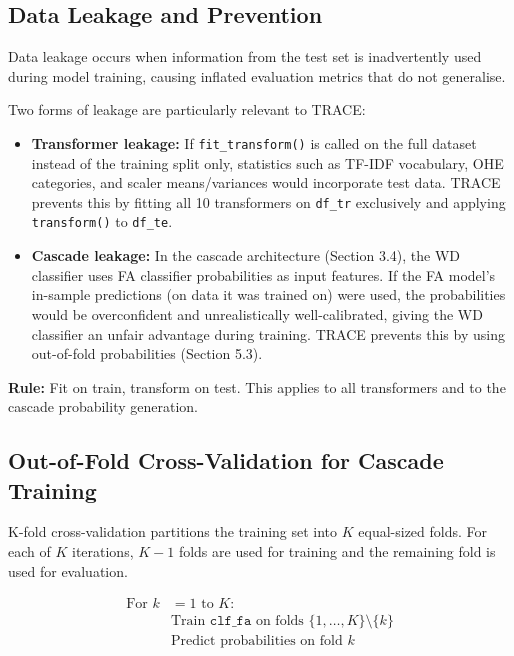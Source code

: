 \documentclass[10pt]{article}
\begin{document}
\subsection{Data Leakage and Prevention}

Data leakage occurs when information from the test set is inadvertently used during model training, causing inflated evaluation metrics that do not generalise.

Two forms of leakage are particularly relevant to TRACE:
\begin{itemize}
    \item \textbf{Transformer leakage:} If \texttt{fit\_transform()} is called on the full dataset instead of the training split only, statistics such as TF-IDF vocabulary, OHE categories, and scaler means/variances would incorporate test data. TRACE prevents this by fitting all 10 transformers on \texttt{df\_tr} exclusively and applying \texttt{transform()} to \texttt{df\_te}.
    \item \textbf{Cascade leakage:} In the cascade architecture (Section 3.4), the WD classifier uses FA classifier probabilities as input features. If the FA model's in-sample predictions (on data it was trained on) were used, the probabilities would be overconfident and unrealistically well-calibrated, giving the WD classifier an unfair advantage during training. TRACE prevents this by using out-of-fold probabilities (Section 5.3).
\end{itemize}

\textbf{Rule:} Fit on train, transform on test. This applies to all transformers and to the cascade probability generation.

\subsection{Out-of-Fold Cross-Validation for Cascade Training}

K-fold cross-validation partitions the training set into \(K\) equal-sized folds. For each of \(K\) iterations, \(K-1\) folds are used for training and the remaining fold is used for evaluation.

\begin{align}
\text{For } k &= 1 \text{ to } K: \\
&\text{Train } \texttt{clf\_fa} \text{ on folds } \{1,\dots,K\}\setminus\{k\} \\
&\text{Predict probabilities on fold } k
\end{align}
\end{document}
